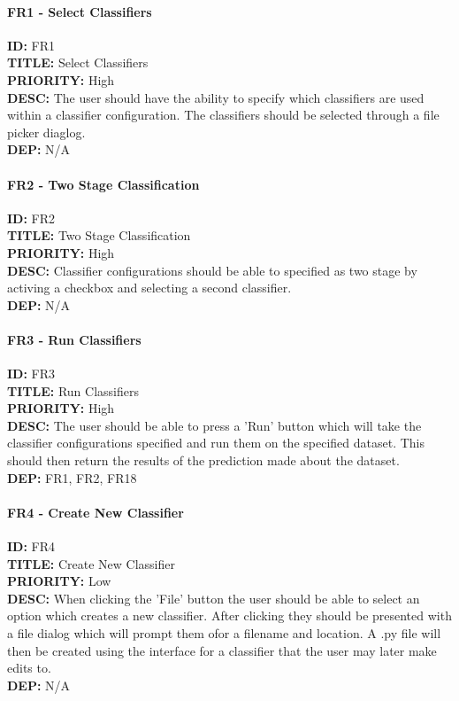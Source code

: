 \paragraph*{FR1 - Select Classifiers}
\textbf{ID:} FR1 \\
\textbf{TITLE:} Select Classifiers \\
\textbf{PRIORITY:} High \\
\textbf{DESC:} The user should have the ability to specify which classifiers are used within a classifier configuration. The classifiers should be selected through a file picker diaglog. \\
\textbf{DEP:} N/A
\paragraph*{FR2 - Two Stage Classification}
\textbf{ID:} FR2 \\
\textbf{TITLE:} Two Stage Classification \\
\textbf{PRIORITY:} High \\
\textbf{DESC:} Classifier configurations should be able to specified as two stage by activing a checkbox and selecting a second classifier. \\
\textbf{DEP:} N/A
\paragraph*{FR3 - Run Classifiers}
\textbf{ID:} FR3 \\
\textbf{TITLE:} Run Classifiers \\
\textbf{PRIORITY:} High \\
\textbf{DESC:} The user should be able to press a 'Run' button which will take the classifier configurations specified and run them on the specified dataset. This should then return the results of the prediction made about the dataset.  \\
\textbf{DEP:} FR1, FR2, FR18
\paragraph*{FR4 - Create New Classifier}
\textbf{ID:} FR4 \\
\textbf{TITLE:} Create New Classifier \\
\textbf{PRIORITY:} Low \\
\textbf{DESC:} When clicking the 'File' button the user should be able to select an option which creates a new classifier. After clicking they should be presented with a file dialog which will prompt them ofor a filename and location. A .py file will then be created using the interface for a classifier that the user may later make edits to.  \\
\textbf{DEP:} N/A
